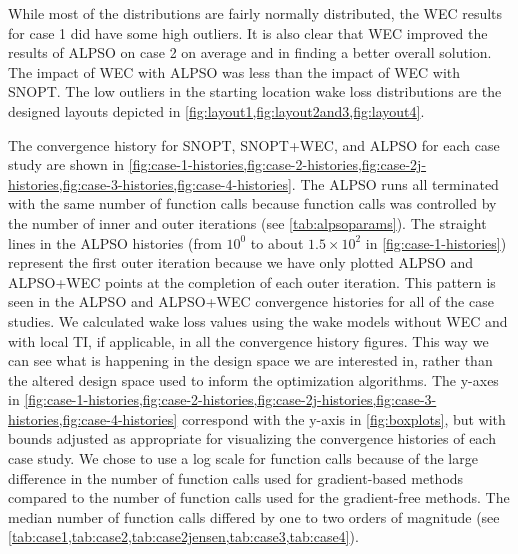 \documentclass{jpconf}
\begin{document}
While most of the distributions are fairly normally distributed, the WEC results for case 1 did have some high outliers. It is also clear that WEC improved the results of ALPSO on case 2 on average and in finding a better overall solution. The impact of WEC with ALPSO was less than the impact of WEC with SNOPT. The low outliers in the starting location wake loss distributions are the designed layouts depicted in \cref{fig:layout1,fig:layout2and3,fig:layout4}.

The convergence history for SNOPT, SNOPT+WEC, and ALPSO for each case study are shown in \cref{fig:case-1-histories,fig:case-2-histories,fig:case-2j-histories,fig:case-3-histories,fig:case-4-histories}. The ALPSO runs all terminated with the same number of function calls because function calls was controlled by the number of inner and outer iterations (see \cref{tab:alpsoparams}). The straight lines in the ALPSO histories (from $10^0$ to about $1.5\times10^2$ in \cref{fig:case-1-histories}) represent the first outer iteration because we have only plotted ALPSO and ALPSO+WEC points at the completion of each outer iteration. This pattern is seen in the ALPSO and ALPSO+WEC convergence histories for all of the case studies. 
We calculated wake loss values using the wake models without WEC and with local TI, if applicable, in all the convergence history figures. This way we can see what is happening in the design space we are interested in, rather than the altered design space used to inform the optimization algorithms. The y-axes in \cref{fig:case-1-histories,fig:case-2-histories,fig:case-2j-histories,fig:case-3-histories,fig:case-4-histories} correspond with the y-axis in \cref{fig:boxplots}, but with bounds adjusted as appropriate for visualizing the convergence histories of each case study. We chose to use a log scale for function calls because of the large difference in the number of function calls used for gradient-based methods compared to the number of function calls used for the gradient-free methods. The median number of function calls differed by one to two orders of magnitude (see \cref{tab:case1,tab:case2,tab:case2jensen,tab:case3,tab:case4}).
\end{document}
